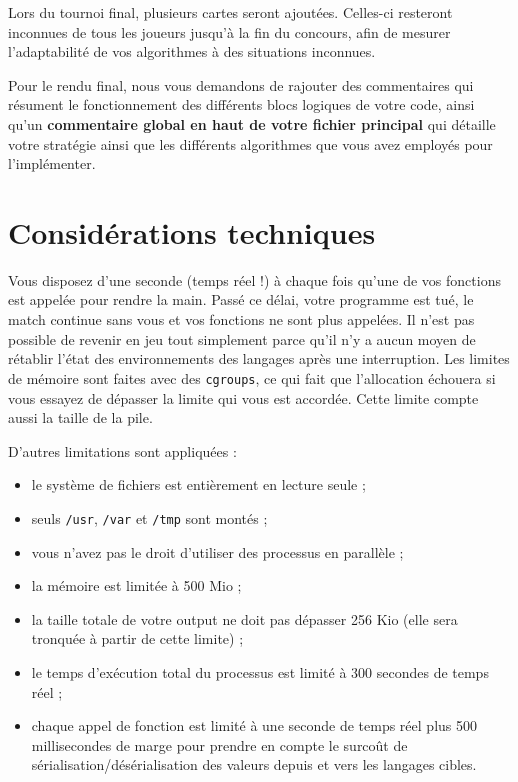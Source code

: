 Lors du tournoi final, plusieurs cartes seront ajoutées. Celles-ci resteront
inconnues de tous les joueurs jusqu'à la fin du concours, afin de mesurer
l'adaptabilité de vos algorithmes à des situations inconnues.

Pour le rendu final, nous vous demandons de rajouter des commentaires qui
résument le fonctionnement des différents blocs logiques de votre code, ainsi
qu'un \textbf{commentaire global en haut de votre fichier principal} qui
détaille votre stratégie ainsi que les différents algorithmes que vous avez
employés pour l'implémenter.

\section{Considérations techniques}

Vous disposez d'une seconde (temps réel !) à chaque fois qu'une de vos
fonctions est appelée pour rendre la main. Passé ce délai, votre programme est
tué, le match continue sans vous et vos fonctions ne sont plus appelées. Il
n'est pas possible de revenir en jeu tout simplement parce qu'il n'y a aucun
moyen de rétablir l'état des environnements des langages après une
interruption.  Les limites de mémoire sont faites avec des \texttt{cgroups}, ce
qui fait que l'allocation échouera si vous essayez de dépasser la limite qui
vous est accordée. Cette limite compte aussi la taille de la pile.

D'autres limitations sont appliquées :

\begin{itemize}
    \item le système de fichiers est entièrement en lecture seule ;
    \item seuls \texttt{/usr}, \texttt{/var} et \texttt{/tmp} sont montés ;
    \item vous n'avez pas le droit d'utiliser des processus en parallèle ;
    \item la mémoire est limitée à 500 Mio ;
    \item la taille totale de votre output ne doit pas dépasser 256 Kio (elle
        sera tronquée à partir de cette limite) ;
    \item le temps d'exécution total du processus est limité à 300 secondes de
        temps réel ;
    \item chaque appel de fonction est limité à une seconde de temps réel plus
        500 millisecondes de marge pour prendre en compte le surcoût de
        sérialisation/désérialisation des valeurs depuis et vers les langages
        cibles.
\end{itemize}
